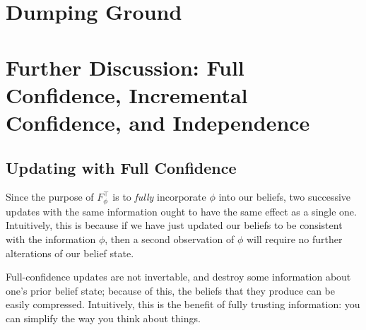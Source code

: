 \begin{subappendices}
    \section{Dumping Ground}


    \section{Further Discussion: Full Confidence, Incremental Confidence, and Independence}


    \subsection{Updating with Full Confidence}
    	\label{sec:full-conf}
    Since the purpose of
    $F^\top_\phi$
    is to \emph{fully} incorporate $\phi$ into our beliefs,
    two successive updates with the same information ought to have the same effect as a single one.
    Intuitively, this is because if we have just updated our beliefs to be consistent with the information $\phi$, then a second observation of $\phi$ will require no further alterations of our belief state.

    Full-confidence updates are not invertable,
    and destroy some information about one's prior belief state;
    because of this, the beliefs that they produce can be easily compressed.
    Intuitively, this is the benefit of fully trusting information: you
    can simplify the way you think about things.


\end{subappendices}
